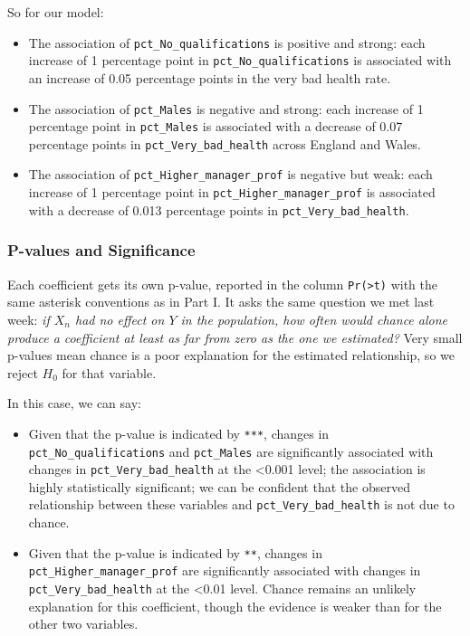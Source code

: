 \documentclass[
  letterpaper,
  DIV=11,
  numbers=noendperiod]{scrreprt}
\providecommand{\tightlist}{%
  \setlength{\itemsep}{0pt}\setlength{\parskip}{0pt}}
\begin{document}
So for our model:

\begin{itemize}
\tightlist
\item
  The association of \texttt{pct\_No\_qualifications} is positive and
  strong: each increase of 1 percentage point in
  \texttt{pct\_No\_qualifications} is associated with an increase of
  0.05 percentage points in the very bad health rate.
\item
  The association of \texttt{pct\_Males} is negative and strong: each
  increase of 1 percentage point in \texttt{pct\_Males} is associated
  with a decrease of 0.07 percentage points in
  \texttt{pct\_Very\_bad\_health} across England and Wales.
\item
  The association of \texttt{pct\_Higher\_manager\_prof} is negative but
  weak: each increase of 1 percentage point in
  \texttt{pct\_Higher\_manager\_prof} is associated with a decrease of
  0.013 percentage points in \texttt{pct\_Very\_bad\_health}.
\end{itemize}

\subsubsection{P-values and
Significance}\label{p-values-and-significance}

Each coefficient gets its own p-value, reported in the column
\texttt{Pr(\textgreater{}\textbar{}t\textbar{})} with the same asterisk
conventions as in Part I. It asks the same question we met last week:
\emph{if \(X_n\) had no effect on \(Y\) in the population, how often
would chance alone produce a coefficient at least as far from zero as
the one we estimated?} Very small p-values mean chance is a poor
explanation for the estimated relationship, so we reject \(H_0\) for
that variable.

In this case, we can say:

\begin{itemize}
\tightlist
\item
  Given that the p-value is indicated by \texttt{***}, changes in
  \texttt{pct\_No\_qualifications} and \texttt{pct\_Males} are
  significantly associated with changes in
  \texttt{pct\_Very\_bad\_health} at the \textless0.001 level; the
  association is highly statistically significant; we can be confident
  that the observed relationship between these variables and
  \texttt{pct\_Very\_bad\_health} is not due to chance.
\item
  Given that the p-value is indicated by \texttt{**}, changes in
  \texttt{pct\_Higher\_manager\_prof} are significantly associated with
  changes in \texttt{pct\_Very\_bad\_health} at the \textless0.01 level.
  Chance remains an unlikely explanation for this coefficient, though
  the evidence is weaker than for the other two variables.
\end{itemize}
\end{document}
